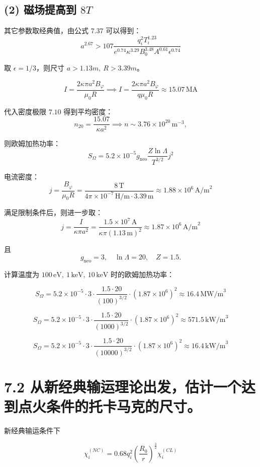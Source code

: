 \documentclass{article}
\begin{document}
\subsection*{(2) 磁场提高到 $8T$}

其它参数取经典值，由公式 $7.37$ 可以得到：$$a^{2.67} > 107 \frac{q_i^2 T_i^{1.23}}{e^{0.74} \kappa^{3.29} B_0^{3.48} A^{0.61} \epsilon^{0.74}}$$

取 $\epsilon = 1/3$，则尺寸 $a > 1.13m,\ R > 3.39m$。

$$I = \frac{2 \kappa \pi a^2 B_\varphi}{\mu_0 R} \implies I = \frac{2 \kappa \pi a^2 B_\varphi}{q \mu_0 R} \approx 15.07 \, \text{MA}$$

代入密度极限 $7.10$ 得到平均密度：$$n_{20} = \frac{15.07}{\kappa a^2} \implies n \sim 3.76 \times 10^{20} \, \text{m}^{-3},$$

则欧姆加热功率：$$S_\Omega = 5.2 \times 10^{-5} g_{\text{neo}} \frac{Z \ln \Lambda}{T^{3/2}} j^2$$

电流密度：$$j = \frac{B_\varphi}{\mu_0 R} = \frac{8 \, \text{T}}{4\pi \times 10^{-7} \, \text{H/m} \cdot 3.39 \, \text{m}} \approx 1.88 \times 10^6 \, \text{A/m}^2$$

满足限制条件后，则进一步取：$$j = \frac{I}{\kappa \pi a^2} = \frac{1.5 \times 10^7 \, \text{A}}{\kappa \pi (1.13 \, \text{m})^2} \approx 1.87 \times 10^6 \, \text{A/m}^2$$

且$$g_{\text{neo}} = 3, \quad \ln \Lambda = 20, \quad Z = 1.5.$$

计算温度为 $100 \, \text{eV},\ 1 \, \text{keV},\ 10 \, \text{keV}$ 时的欧姆加热功率：

$$S_\Omega = 5.2 \times 10^{-5} \cdot 3 \cdot \frac{1.5 \cdot 20}{(100)^{3/2}} \cdot (1.87 \times 10^6)^2 \approx 16.4 \, \text{MW/m}^3$$

$$S_\Omega = 5.2 \times 10^{-5} \cdot 3 \cdot \frac{1.5 \cdot 20}{(1000)^{3/2}} \cdot (1.87 \times 10^6)^2 \approx 571.5 \, \text{kW/m}^3$$

$$S_\Omega = 5.2 \times 10^{-5} \cdot 3 \cdot \frac{1.5 \cdot 20}{(10000)^{3/2}} \cdot (1.87 \times 10^6)^2 \approx 16.4 \, \text{kW/m}^3$$

\section*{7.2 从新经典输运理论出发，估计一个达到点火条件的托卡马克的尺寸。}

新经典输运条件下

$$\chi_i^{(NC)} = 0.68 q_i^2 \left( \frac{R_0}{r} \right)^{\frac{3}{2}} \chi_i^{(CL)}$$
\end{document}
